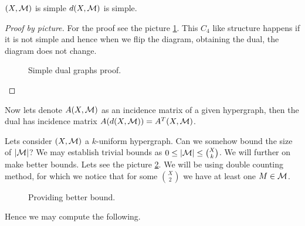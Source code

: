 \begin{lemma}
	$(X,\mathcal{M})$ is simple \ifft $d(X,\mathcal{M})$ is simple.
\end{lemma}

\begin{proof}[Proof by picture]
	For the proof see the picture \ref{simple-dual-hg}. This $C_4$ like structure happens if it is not simple and hence when we flip the diagram, obtaining the dual, the diagram does not change.
	
	\begin{figure}[!ht]\centering
		\caption{Simple dual graphs proof.}
		\label{simple-dual-hg}
	\end{figure}
\end{proof}

Now lets denote $A(X,\mathcal{M})$ as an incidence matrix of a given hypergraph, then the dual has incidence matrix $A(d(X,\mathcal{M})) = A^T(X,\mathcal{M})$.

Lets consider $(X, \mathcal{M})$ a $k$-uniform hypergraph. Can we somehow bound the size of $|\mathcal{M}|$? We may establish trivial bounds as $0 \leq |\mathcal{M}| \leq \binom{X}{k}$. We will further on make better bounds. Lets see the picture \ref{bounds}. We will be using double counting method, for which we notice that for some $\binom{X}{2}$ we have at least one $M \in \mathcal{M}$.

\begin{figure}[!ht]\centering
	\caption{Providing better bound.}
	\label{bounds}
\end{figure}

\noindent Hence we may compute the following.

